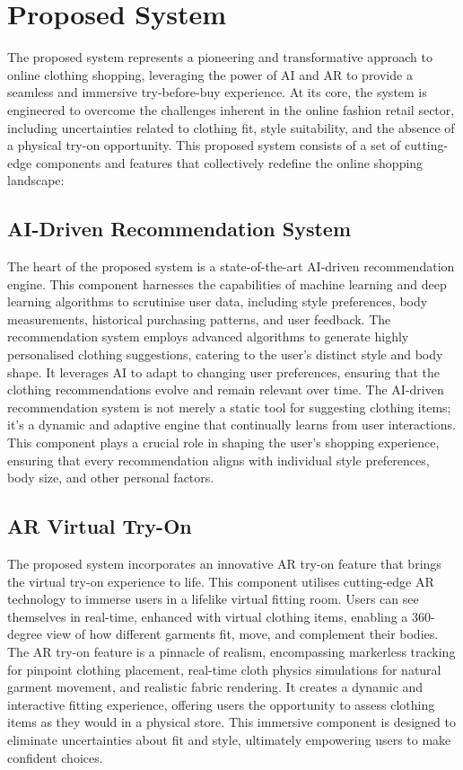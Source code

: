 \section{Proposed System}
	The proposed system represents a pioneering and transformative approach to online clothing shopping, leveraging the power of AI and AR to provide a seamless and immersive try-before-buy experience. At its core, the system is engineered to overcome the challenges inherent in the online fashion retail sector, including uncertainties related to clothing fit, style suitability, and the absence of a physical try-on opportunity. This proposed system consists of a set of cutting-edge components and features that collectively redefine the online shopping landscape:

	\subsection{AI-Driven Recommendation System}
		The heart of the proposed system is a state-of-the-art AI-driven recommendation engine. This component harnesses the capabilities of machine learning and deep learning algorithms to scrutinise user data, including style preferences, body measurements, historical purchasing patterns, and user feedback. The recommendation system employs advanced algorithms to generate highly personalised clothing suggestions, catering to the user's distinct style and body shape. It leverages AI to adapt to changing user preferences, ensuring that the clothing recommendations evolve and remain relevant over time. The AI-driven recommendation system is not merely a static tool for suggesting clothing items; it's a dynamic and adaptive engine that continually learns from user interactions. This component plays a crucial role in shaping the user's shopping experience, ensuring that every recommendation aligns with individual style preferences, body size, and other personal factors.

	\subsection{AR Virtual Try-On}
		The proposed system incorporates an innovative AR try-on feature that brings the virtual try-on experience to life. This component utilises cutting-edge AR technology to immerse users in a lifelike virtual fitting room. Users can see themselves in real-time, enhanced with virtual clothing items, enabling a 360-degree view of how different garments fit, move, and complement their bodies. The AR try-on feature is a pinnacle of realism, encompassing markerless tracking for pinpoint clothing placement, real-time cloth physics simulations for natural garment movement, and realistic fabric rendering. It creates a dynamic and interactive fitting experience, offering users the opportunity to assess clothing items as they would in a physical store. This immersive component is designed to eliminate uncertainties about fit and style, ultimately empowering users to make confident choices.

